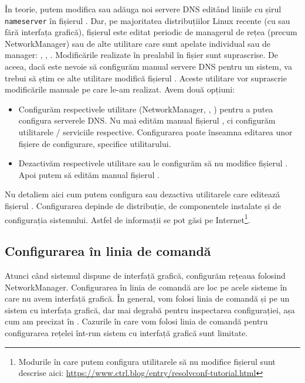 În teorie, putem modifica sau adăuga noi servere DNS editând liniile cu șirul \texttt{nameserver} în fișierul .
Dar, pe majoritatea distribuțiilor Linux recente (cu sau fără interfața grafică), fișierul  este editat periodic de managerul de rețea (precum NetworkManager) sau de alte utilitare care sunt apelate individual sau de manager: , , .
Modificările realizate în prealabil în fișier sunt suprascrise.
De aceea, dacă este nevoie să configurăm manual servere DNS pentru un sistem, va trebui să știm ce alte utilitare modifică fișierul .
Aceste utilitare vor suprascrie modificările manuale pe care le-am realizat.
Avem două opțiuni:
\begin{itemize}
  \item Configurăm respectivele utilitare (NetworkManager, , ) pentru a putea configura serverele DNS.
    Nu mai edităm manual fișierul , ci configurăm utilitarele / serviciile respective.
    Configurarea poate înseamna editarea unor fișiere de configurare, specifice utilitarului.
  \item Dezactivăm respectivele utilitare sau le configurăm să nu modifice fișierul .
    Apoi putem să edităm manual fișierul .
\end{itemize}

Nu detaliem aici cum putem configura sau dezactiva utilitarele care editează fișierul .
Configurarea depinde de distribuție, de componentele instalate și de configurația sistemului.
Astfel de informații se pot găsi pe Internet\footnote{Modurile în care putem configura utilitarele să nu modifice fișierul  sunt descrise aici: \url{https://www.ctrl.blog/entry/resolvconf-tutorial.html}}.

\subsection{Configurarea în linia de comandă}
\label{sec:net:linux-config:cli}

Atunci când sistemul dispune de interfață grafică, configurăm rețeaua folosind NetworkManager.
Configurarea în linia de comandă are loc pe acele sisteme în care nu avem interfață grafică.
În general, vom folosi linia de comandă și pe un sistem cu interfața grafică, dar mai degrabă pentru inspectarea configurației, așa cum am precizat în .
Cazurile în care vom folosi linia de comandă pentru configurarea rețelei înt-run sistem cu interfață grafică sunt limitate.

